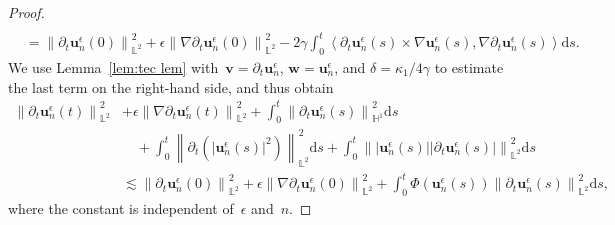 \documentclass[11pt,reqno]{amsart}
\theoremstyle{definition}
\numberwithin{equation}{section}
\newcommand{\bff}{\boldsymbol}
\newcommand{\bb}{\mathbb}
\newcommand{\ds}{\mathrm{d}s}
\newcommand{\pa}{\partial}
\newcommand{\nn}{\nonumber}
\newcommand{\norm}[2]{\left\|{#1}\right\|_{#2}}
\newcommand{\inpro}[2]{\left\langle#1,#2\right\rangle}
\begin{document}
\begin{proof}
\begin{align}
		\\
		&=
		\norm{\pa_t\bff{u}^\epsilon_n(0)}{\bb{L}^2}^2
		+
		\epsilon \norm{\nabla\pa_t\bff{u}^\epsilon_n(0)}{\bb{L}^2}^2
		-
		2\gamma\int_0^t
		\inpro{\pa_t\bff{u}^\epsilon_n(s)\times\nabla\bff{u}^\epsilon_n(s)}%
		{\nabla\pa_t\bff{u}^\epsilon_n(s)}\ds.
	\end{align}
	We use Lemma~\ref{lem:tec
		lem} with~$\bff{v}=\pa_t \bff{u}_n^\epsilon$,
	$\bff{w}=\bff{u}_n^\epsilon$, and $\delta=\kappa_1/4\gamma$ to estimate the last term on
	the right-hand side, and thus obtain
	\begin{align}\label{equ:dtune 2}
		\norm{\pa_t\bff{u}^\epsilon_n(t)}{\bb{L}^2}^2
		&+ \epsilon \norm{\nabla\pa_t\bff{u}^\epsilon_n(t)}{\bb{L}^2}^2
		+ \int_0^t \norm{\pa_t\bff{u}^\epsilon_n(s)}{\bb{H}^1}^2\ds
		\nn\\
		&\quad
		+ \int_0^t \norm{\pa_t(|\bff{u}^\epsilon_n(s)|^2)}{\bb{L}^2}^2\ds
		+ \int_0^t \norm{|\bff{u}^\epsilon_n(s)||\pa_t\bff{u}^\epsilon_n(s)|}{\bb{L}^2}^2\ds
		\nn\\
		&\lesssim 
		\norm{\pa_t\bff{u}^\epsilon_n(0)}{\bb{L}^2}^2
		+
		\epsilon \norm{\nabla\pa_t\bff{u}^\epsilon_n(0)}{\bb{L}^2}^2
		+
		\int_0^t
		\Phi(\bff{u}_n^\epsilon(s))
		\norm{\pa_t\bff{u}_n^\epsilon(s)}{\bb{L}^2}^{2}
		\ds,
	\end{align}
	where the constant is independent of~$\epsilon$ and~$n$. 
	

\end{proof}
\end{document}
